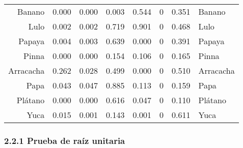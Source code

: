 \documentclass[11pt]{article}
\begin{document}
\begin{tabular}{r|lllllll}
	Banano & 0.000            & 0.000            & 0.003            & 0.544            & 0                & 0.351            & Banano          \\
	Lulo & 0.002            & 0.002            & 0.719            & 0.901            & 0                & 0.468            & Lulo            \\
	Papaya & 0.004            & 0.003            & 0.639            & 0.000            & 0                & 0.391            & Papaya          \\
	Pinna & 0.000            & 0.000            & 0.154            & 0.106            & 0                & 0.165            & Pinna           \\
	Arracacha & 0.262            & 0.028            & 0.499            & 0.000            & 0                & 0.510            & Arracacha       \\
	Papa & 0.043            & 0.047            & 0.885            & 0.113            & 0                & 0.159            & Papa            \\
	Plátano & 0.000            & 0.000            & 0.616            & 0.047            & 0                & 0.110            & Plátano         \\
	Yuca & 0.015            & 0.001            & 0.143            & 0.001            & 0                & 0.611            & Yuca            \\
\end{tabular}


    
    \hypertarget{prueba-de-rauxedz-unitaria}{%
\subsubsection{2.2.1 Prueba de raíz
unitaria}\label{prueba-de-rauxedz-unitaria}}
\end{document}
